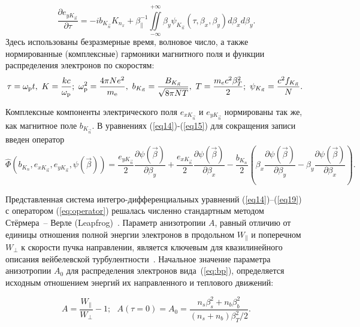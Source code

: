 \begin{equation}
\label{eq19}
    \dfrac{\partial e_{y{K_{\vec{n}}}}}{\partial \tau}=-ib_{K_{\vec{n}}}K_{n_x}+\beta_{\|}^{-1}{\iint\limits^{+\infty}_{-\infty}\beta_y\psi_{K_{\vec{n}}}(\tau,\beta_x,\beta_y)d\beta_xd\beta_y} .
\end{equation}
Здесь использованы безразмерные время, волновое число, а также нормированные (комплексные) гармоники магнитного поля и функции распределения электронов по скоростям: 
\begin{equation}
    \label{eq19plus1}
    \tau=\wpl t, \
    K=\dfrac{kc}{\wpl}; \ 
    \wpl^2=\dfrac{4\pi Ne^2}{\me},\
    b_{K_{\vec{n}}}=\dfrac{B_{K_{\vec{n}}}}{\sqrt{8\pi N T}},\
    T=\dfrac{m_ec^2\beta_{T}^2}{2};\
    \psi_{K_{\vec{n}}}=\dfrac{c^2f_{ K_{\vec{n}}}}{N}.\ 
\end{equation}

Комплексные компоненты электрического поля $e_{x{K_{\vec{n}}}}$ и $e_{y{K_{\vec{n}}}}$ нормированы так же, как магнитное поле $b_{K_{\vec{n}}}$. В уравнениях (\ref{eq14})-(\ref{eq15}) для сокращения записи введен оператор
\begin{equation}
\label{eq:operator}
    \hat \Phi(b_{K_n},e_{x{K_{\vec{n}}}},e_{y{K_{\vec{n}}}},\psi(\vec{\beta}))=\dfrac{e_{y{K_{\vec{n}}}}}{2}\dfrac{\partial \psi(\vec{\beta})}{\partial \beta_y}+\dfrac{e_{x{K_{\vec{n}}}}}{2}\dfrac{\partial \psi(\vec{\beta})}{\partial \beta_x}-\dfrac{b_{K_n}}{2} \left(\beta_x\dfrac{\partial \psi(\vec{\beta})}{\partial \beta_y}-\beta_y\dfrac{\partial \psi(\vec{\beta})}{\partial \beta_x}\right).
\end{equation}

Представленная система интегро-дифференциальных уравнений (\ref{eq14})--(\ref{eq19}) с оператором (\ref{eq:operator}) решалась численно стандартным методом Стёрмера~-- Верле (Leapfrog)~\cite{Birdsall2018}. Параметр анизотропии $A$, равный отличию от единицы отношения полной энергии электронов в продольном $W_\|$ и поперечном $W_\perp$ к скорости пучка направлении, является ключевым для квазилинейного описания вейбелевской турбулентности~\cite{Weibel1959,Davidson1972,Lemons1979,Tzoufras2006,Kuznetsov2023}. Начальное значение параметра анизотропии $A_0$ для распределения электронов вида~(\ref{eq:bp}), определяется исходным отношением энергий их направленного и теплового движений:

\begin{equation}
A=\frac{W_\|}{W_\perp}-1;~~~A(\tau=0)=A_0=\frac{n_s\beta_s^2+n_b\beta_b^2}{(n_s+n_b)\beta_T^2/2}.
\label{anisotropy}
\end{equation}

